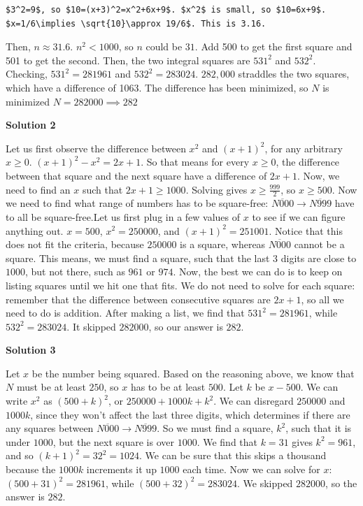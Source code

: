 \begin{enumerate}
 \begin{verbatim}
$3^2=9$, so $10=(x+3)^2=x^2+6x+9$. $x^2$ is small, so $10=6x+9$. $x=1/6\implies \sqrt{10}\approx 19/6$. This is 3.16.
\end{verbatim}

Then, $n\approx 31.6$. $n^2<1000$, so $n$ could be $31$. Add 500 to get the first square and 501 to get the second. Then, the two integral squares are $531^2$ and $532^2$. Checking, $531^2=281961$ and $532^2=283024$. $282,000$ straddles the two squares, which have a difference of 1063. The difference has been minimized, so $N$ is minimized $N=282000\implies\boxed{282}$




\textbf{Solution 2}

Let us first observe the difference between $x^2$ and $(x+1)^2$, for any arbitrary $x\ge 0$. $(x+1)^2-x^2=2x+1$. So that means for every $x\ge 0$, the difference between that square and the next square have a difference of $2x+1$. Now, we need to find an $x$ such that $2x+1\ge 1000$. Solving gives $x\ge \frac{999}{2}$, so $x\ge 500$. Now we need to find what range of numbers has to be square-free: $\overline{N000}\rightarrow \overline{N999}$ have to all be square-free.Let us first plug in a few values of $x$ to see if we can figure anything out. $x=500$, $x^2=250000$, and $(x+1)^2=251001$. Notice that this does not fit the criteria, because $250000$ is a square, whereas $\overline{N000}$ cannot be a square. This means, we must find a square, such that the last $3$ digits are close to $1000$, but not there, such as $961$ or $974$. Now, the best we can do is to keep on listing squares until we hit one that fits. We do not need to solve for each square: remember that the difference between consecutive squares are $2x+1$, so all we need to do is addition. After making a list, we find that $531^2=281961$, while $532^2=283024$. It skipped $282000$, so our answer is $\boxed{282}$.

 



\textbf{Solution 3}

Let $x$ be the number being squared. Based on the reasoning above, we know that $N$ must be at least $250$, so $x$ has to be at least $500$. Let $k$ be $x-500$. We can write $x^2$ as $(500+k)^2$, or $250000+1000k+k^2$. We can disregard $250000$ and $1000k$, since they won't affect the last three digits, which determines if there are any squares between $\overline{N000}\rightarrow \overline{N999}$. So we must find a square, $k^2$, such that it is under $1000$, but the next square is over $1000$. We find that $k=31$ gives $k^2=961$, and so $(k+1)^2=32^2=1024$. We can be sure that this skips a thousand because the $1000k$ increments it up $1000$ each time. Now we can solve for $x$: $(500+31)^2=281961$, while $(500+32)^2=283024$. We skipped $282000$, so the answer is $\boxed{282}$.


\end{enumerate}
